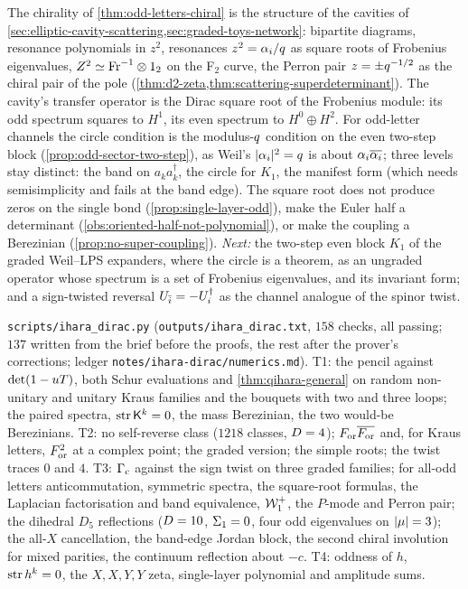 \begin{observation}
\label{obs:square-root-dictionary}
The chirality of \cref{thm:odd-letters-chiral} is the structure of the cavities of
\cref{sec:elliptic-cavity-scattering,sec:graded-toys-network}: bipartite diagrams, resonance polynomials in
$z^2$, resonances $z^2 = \alpha_{i}/q$ as square roots of Frobenius eigenvalues, $Z^2\simeq\mathrm{Fr}^{-1}\otimes1_2$
on the F$_2$ curve, the Perron pair $z = \pm q^{-1/2}$ as the chiral pair of the pole
(\cref{thm:d2-zeta,thm:scattering-superdeterminant}). The cavity's transfer operator is the Dirac square
root of the Frobenius module: its odd spectrum squares to $H^1$, its even spectrum to $H^0\oplus H^2$. For
odd-letter channels the circle condition is the modulus-$q$ condition on the even two-step block
(\cref{prop:odd-sector-two-step}), as Weil's $|\alpha_{i}|^2 = q$ is about $\alpha_{i}\overline{\alpha_{i}}$;
three levels stay distinct: the band on $a_ka_k^\dagger$, the circle for $K_1$, the manifest form (which
needs semisimplicity and fails at the band edge). The square root does not produce zeros on the single bond
(\cref{prop:single-layer-odd}), make the Euler half a determinant (\cref{obs:oriented-half-not-polynomial}),
or make the coupling a Berezinian (\cref{prop:no-super-coupling}).
\emph{Next:} the two-step even block $K_1$ of the graded Weil--LPS expanders, where the circle is a theorem,
as an ungraded operator whose spectrum is a set of Frobenius eigenvalues, and its invariant form; and a
sign-twisted reversal $U_{\bar{i}} = -U_{i}^\dagger$ as the channel analogue of the spinor twist.
\end{observation}

\begin{numerical}
\label{num:ihara-dirac}
\texttt{scripts/ihara\_dirac.py} (\texttt{outputs/ihara\_dirac.txt}, $158$ checks, all passing; $137$ written
from the brief before the proofs, the rest after the prover's corrections; ledger
\texttt{notes/ihara-dirac/numerics.md}). T1: the pencil against $\det(1-uT)$, both Schur evaluations
and \cref{thm:qihara-general} on random non-unitary and unitary Kraus families and the bouquets with two and
three loops; the paired spectra, $\operatorname{str}\mathsf K^k = 0$, the mass Berezinian, the two would-be Berezinians. T2:
no self-reverse class ($1218$ classes, $D = 4$); $F_{\mathrm{or}}\overline{F_{\mathrm{or}}}$ and, for Kraus letters,
$F_{\mathrm{or}}^2$ at a complex point; the graded version; the simple roots; the twist traces $0$ and $4$.
T3: $\Gamma_{\mathrm c}$ against the sign twist on three graded families; for all-odd letters anticommutation, symmetric
spectra, the square-root formulas, the Laplacian factorisation and band equivalence, $\mathcal W_1^+$, the
$P$-mode and Perron pair; the dihedral $D_5$ reflections ($D = 10$, $\Sigma_1 = 0$, four odd eigenvalues on
$|\mu| = 3$); the all-$X$ cancellation, the band-edge Jordan block, the second chiral involution for
mixed parities, the continuum reflection about $-c$. T4: oddness of $h$, $\operatorname{str} h^k = 0$, the $X,X,Y,Y$
zeta, single-layer polynomial and amplitude sums.
\end{numerical}
